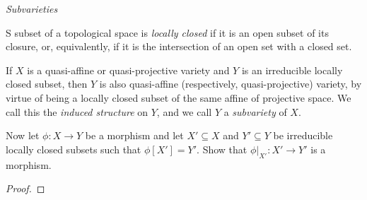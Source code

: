 \label{1.3.10}

\emph{Subvarieties}

S subset of a topological space is \emph{locally closed} if it is an open subset of its closure, or, equivalently, if it is the intersection of an open set with a closed set.

If $X$ is a quasi-affine or quasi-projective variety and $Y$ is an irreducible locally closed subset, then $Y$ is also quasi-affine (respectively, quasi-projective) variety, by virtue of being a locally closed subset of the same affine of projective space. We call this the \emph{induced structure} on $Y$, and we call $Y$ a \emph{subvariety} of $X$.

Now let $\phi: X \longrightarrow Y$ be a morphism and let $X' \subseteq X$ and $Y' \subseteq Y$ be irreducible locally closed subsets such that $\phi[X'] = Y'$. Show that $\phi|_{X'}: X' \longrightarrow Y'$ is a morphism.

\begin{proof}

\end{proof}
